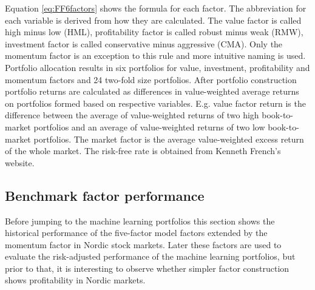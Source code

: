 \documentclass[12pt]{article}
\begin{document}
Equation \ref{eq:FF6factors} shows the formula for each factor. The abbreviation for each variable is derived from how they are calculated. The value factor is called high minus low (HML), profitability factor is called robust minus weak (RMW), investment factor is called conservative minus aggressive (CMA). Only the momentum factor is an exception to this rule and more intuitive naming is used. Portfolio allocation results in six portfolios for value, investment, profitability and momentum factors and 24 two-fold size portfolios. After portfolio construction portfolio returns are calculated as differences in value-weighted average returns on portfolios formed based on respective variables. E.g. value factor return is the difference between the average of value-weighted returns of two high book-to-market portfolios and an average of value-weighted returns of two low book-to-market portfolios. The market factor is the average value-weighted excess return of the whole market. The risk-free rate is obtained from Kenneth French's website. \par

\subsection{Benchmark factor performance}\label{BenchmarkFactorPerformance}

Before jumping to the machine learning portfolios this section shows the historical performance of the \citet{FAMA20151} five-factor model factors extended by the momentum factor in Nordic stock markets. Later these factors are used to evaluate the risk-adjusted performance of the machine learning portfolios, but prior to that, it is interesting to observe whether simpler factor construction shows profitability in Nordic markets. \par
\end{document}
